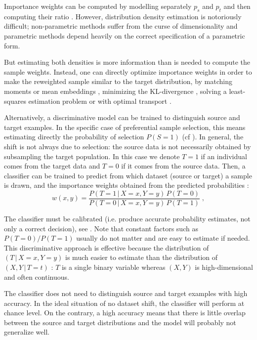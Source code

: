 \documentclass[twocolumn]{article}
\newcommand{\giv}{ \,|\, }
\begin{document}
Importance weights can be computed by modelling separately \(p_s\) and \(p_t\)
and then computing their ratio \citep[Sec. 4.1]{sugiyama2012machine}.
%
However, distribution density estimation is notoriously difficult; non-parametric methods
suffer from the curse of dimensionality and parametric methods depend heavily on
the correct specification of a parametric form.
%

But estimating both densities is more information than is needed to compute
the sample weights.
%
Instead, one can directly optimize importance weights in order to make the
reweighted sample similar to the target distribution, by matching moments
\citep{sun2016return} or mean embeddings
\citep{huang2007correcting,zhang2013domain}, minimizing the KL-divergence
\citep{sugiyama2008direct}, solving a least-squares estimation problem
\citep{kanamori2009least} or with optimal transport \citep{courty2016optimal}.
%

Alternatively, a discriminative model can be trained to distinguish source and target
examples. In the specific case of preferential sample selection, this means estimating
directly the probability of selection \(P(S=1)\) (cf
).
%
In general, the shift is not always due to selection: the source data is not
necessarily obtained by subsampling the target population. In this case we
denote \(T = 1\) if an individual comes from the target data and \(T = 0\) if it
comes from the source data.
%
Then, a classifier can be trained to predict from which dataset (source
or target) a sample is drawn, and the importance weights obtained from the
predicted probabilities \citep[Sec. 4.3]{sugiyama2012machine}:
%
\begin{equation}
  w(x, y) = \frac{P(T=1 \giv X=x, Y=y)\,P(T=0)}{P(T=0 \giv X=x, Y=y)\,P(T=1)} \;,
\end{equation}

%
The classifier must be calibrated (i.e. produce accurate
probability estimates, not only a correct decision), see
\citet{niculescu2005predicting}.
%
Note that constant factors such as \(P(T=0) / P(T=1)\) usually do not matter and are easy
to estimate if needed.
%
This discriminative approach is effective because the distribution of \((T \giv
X=x, Y=y)\) is much easier to estimate than the distribution of \((X, Y \giv
T=t)\) : \(T\) is a single binary variable whereas \((X, Y)\) is
high-dimensional and often continuous.
%

The classifier does not need to distinguish source and target examples with high
accuracy. In the ideal situation of no dataset shift, the classifier will
perform at chance level. On the contrary, a high accuracy means that there is
little overlap between the source and target distributions and the model
will probably not generalize well.
\end{document}
